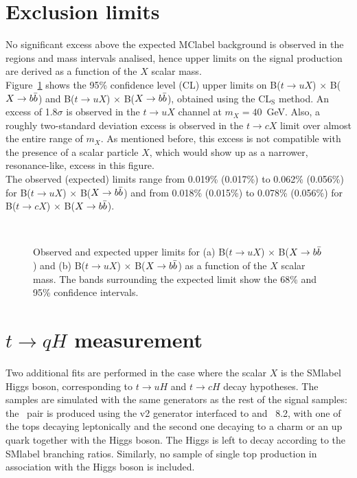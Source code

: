\clearpage

\section{Exclusion limits}

No significant excess above the expected \acrshort{MClabel} background is observed in the regions and mass intervals analised, hence upper limits on the signal production are derived as a function of the $X$ scalar mass.\\

Figure~\ref{tqX:xseclimits} shows the 95\% confidence level (CL) upper limits on B($t\to uX$) $\times$ B($X\to b\bar{b}$) and B($t\to uX$) $\times$ B($X\to b\bar{b}$), obtained using the CL$_\text{S}$ method. An excess of 1.8$\sigma$ is observed in the $t\to uX$ channel at $m_X=40$~GeV. Also, a roughly two-standard deviation excess is observed in the $t\to cX$ limit over almost the entire range of $m_X$. As mentioned before, this excess is not compatible with the presence of a scalar particle $X$, which would show up as a narrower, resonance-like, excess in this figure.\\

The observed (expected) limits range from 0.019\% (0.017\%) to 0.062\% (0.056\%) for B($t\to uX$) $\times$ B($X\to b\bar{b}$) and from 0.018\% (0.015\%) to 0.078\% (0.056\%) for B($t\to cX$) $\times$ B($X\to b\bar{b}$).\\

\begin{figure}[htb]
    \RawFloats
    \centering
    \\
    \caption{Observed and expected upper limits for (a) B($t\to uX$) $\times$ B($X\to b\bar{b}$) and (b) B($t\to uX$) $\times$ B($X\to b\bar{b}$) as a function of the $X$ scalar mass. The bands surrounding the expected limit show the 68\% and 95\% confidence intervals.}
    \label{tqX:xseclimits}
\end{figure}

\section{$t\to qH$ measurement}

Two additional fits are performed in the case where the scalar $X$ is the \acrshort{SMlabel} Higgs boson, corresponding to $t\to uH$ and $t\to cH$ decay hypotheses. The samples are simulated with the same generators as the rest of the signal samples: the \ttbar\ pair is produced using the \POWHEGBOX v2 generator interfaced to \MADSPIN and \PYTHIA~8.2, with one of the tops decaying leptonically and the second one decaying to a charm or an up quark together with the Higgs boson. The Higgs is left to decay according to the \acrshort{SMlabel} branching ratios. Similarly, no sample of single top production in association with the Higgs boson is included.\\

